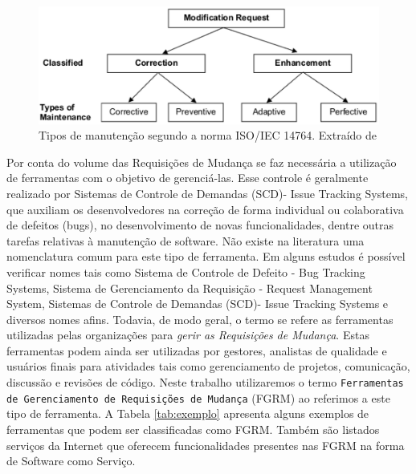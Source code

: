 \begin{figure}[hbtp]
\centering
\includegraphics[width=.75\textwidth]{chapter-intro/img/modification_request.eps}
\caption{Tipos de manutenção segundo a norma ISO/IEC 14764. Extraído de
  \cite{1703974}}
\label{fig:modification-request}
\end{figure}

Por conta do volume das Requisições de Mudança se faz necessária a utilização de ferramentas com o
objetivo de gerenciá-las. Esse controle é geralmente realizado por Sistemas de Controle de Demandas
(SCD)- Issue Tracking Systems, que auxiliam os desenvolvedores na correção de forma individual ou
colaborativa de defeitos (bugs), no desenvolvimento de novas funcionalidades, dentre outras tarefas
relativas à manutenção de software. Não existe na literatura uma nomenclatura comum para este tipo
de ferramenta. Em alguns estudos é possível verificar nomes tais como Sistema de Controle de Defeito
- Bug Tracking Systems, Sistema de Gerenciamento da Requisição - Request Management System, Sistemas
de Controle de Demandas (SCD)- Issue Tracking Systems e diversos nomes afins. Todavia, de modo
geral, o termo se refere as ferramentas utilizadas pelas organizações para \textit{gerir as
	Requisições de Mudança}. Estas ferramentas podem ainda ser utilizadas por gestores, analistas de
qualidade e usuários finais para atividades tais como gerenciamento de projetos, comunicação,
discussão e revisões de código. Neste trabalho utilizaremos o termo \texttt{Ferramentas de Gerenciamento de Requisições de Mudança} (FGRM) ao referimos a este tipo de ferramenta.
A Tabela \ref{tab:exemplo} apresenta alguns exemplos de ferramentas que podem ser classificadas como FGRM. Também são listados serviços da Internet que oferecem funcionalidades presentes nas FGRM na forma de Software como Serviço.

